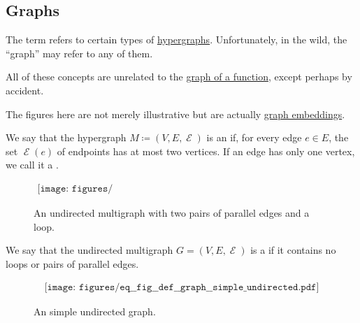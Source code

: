 \subsection{Graphs}\label{subsec:graphs}

\begin{definition}\label{def:graph}
  The term  refers to certain types of \hyperref[def:hypergraph]{hypergraphs}. Unfortunately, in the wild, the \enquote{graph} may refer to any of them.

  All of these concepts are unrelated to the \hyperref[def:multi_valued_function/graph]{graph of a function}, except perhaps by accident.

  The figures here are not merely illustrative but are actually \hyperref[def:quiver_geometric_realization/embedding]{graph embeddings}.

  \begin{thmenum}[series=def:graph]
     We say that the hypergraph \( M \coloneqq (V, E, \mscrE) \) is an  if, for every edge \( e \in E \), the set \( \mscrE(e) \) of endpoints has at most two vertices. If an edge has only one vertex, we call it a .

    \begin{figure}[h]
      \begin{equation}\label{eq:fig:def:graph/undirected_multigraph}
        \begin{aligned}
          \texttt{[image: figures/eq\_\_fig\_\_def\_\_graph\_\_undirected\_multigraph.pdf]}
        \end{aligned}
      \end{equation}
      \caption{An undirected multigraph with two pairs of parallel edges and a loop.}\label{fig:def:graph/undirected_multigraph}
    \end{figure}

     We say that the undirected multigraph \( G = (V, E, \mscrE) \) is a  if it contains no loops or pairs of parallel edges.

    \begin{figure}[h]
      \begin{equation}\label{eq:fig:def:graph/simple_undirected}
        \begin{aligned}
          \texttt{[image: figures/eq\_\_fig\_\_def\_\_graph\_\_simple\_undirected.pdf]}
        \end{aligned}
      \end{equation}
      \caption{An simple undirected graph.}\label{fig:def:graph/simple_undirected}
    \end{figure}


\end{thmenum}
\end{definition}
